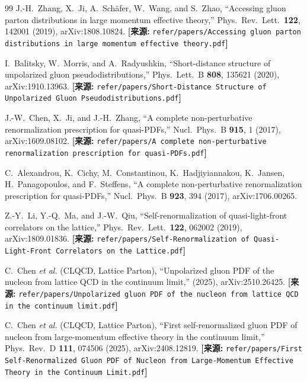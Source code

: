 \documentclass[12pt,a4paper]{ctexart}
\theoremstyle{definition}
\begin{document}
\begin{thebibliography}{99}
J.-H.~Zhang, X.~Ji, A.~Sch\"afer, W.~Wang, and S.~Zhao,
``Accessing gluon parton distributions in large momentum effective theory,''
Phys.\ Rev.\ Lett.\ \textbf{122}, 142001 (2019), arXiv:1808.10824.
\quad\textbf{[来源:} \texttt{refer/papers/Accessing gluon parton distributions in large momentum effective theory.pdf}\textbf{]}

I.~Balitsky, W.~Morris, and A.~Radyushkin,
``Short-distance structure of unpolarized gluon pseudodistributions,''
Phys.\ Lett.\ B \textbf{808}, 135621 (2020), arXiv:1910.13963.
\quad\textbf{[来源:} \texttt{refer/papers/Short-Distance Structure of Unpolarized Gluon Pseudodistributions.pdf}\textbf{]}

J.-W.~Chen, X.~Ji, and J.-H.~Zhang,
``A complete non-perturbative renormalization prescription for quasi-PDFs,''
Nucl.\ Phys.\ B \textbf{915}, 1 (2017), arXiv:1609.08102.
\quad\textbf{[来源:} \texttt{refer/papers/A complete non-perturbative renormalization prescription for quasi-PDFs.pdf}\textbf{]}

C.~Alexandrou, K.~Cichy, M.~Constantinou, K.~Hadjiyiannakou, K.~Jansen, H.~Panagopoulos, and F.~Steffens,
``A complete non-perturbative renormalization prescription for quasi-PDFs,''
Nucl.\ Phys.\ B \textbf{923}, 394 (2017), arXiv:1706.00265.

Z.-Y.~Li, Y.-Q.~Ma, and J.-W.~Qiu,
``Self-renormalization of quasi-light-front correlators on the lattice,''
Phys.\ Rev.\ Lett.\ \textbf{122}, 062002 (2019), arXiv:1809.01836.
\quad\textbf{[来源:} \texttt{refer/papers/Self-Renormalization of Quasi-Light-Front Correlators on the Lattice.pdf}\textbf{]}


C.~Chen \textit{et al.} (CLQCD, Lattice Parton),
``Unpolarized gluon PDF of the nucleon from lattice QCD in the continuum limit,''
(2025), arXiv:2510.26425.
\quad\textbf{[来源:} \texttt{refer/papers/Unpolarized gluon PDF of the nucleon from lattice QCD in the continuum limit.pdf}\textbf{]}

C.~Chen \textit{et al.} (CLQCD, Lattice Parton),
``First self-renormalized gluon PDF of nucleon from large-momentum effective theory in the continuum limit,''
Phys.\ Rev.\ D \textbf{111}, 074506 (2025), arXiv:2408.12819.
\quad\textbf{[来源:} \texttt{refer/papers/First Self-Renormalized Gluon PDF of Nucleon from Large-Momentum Effective Theory in the Continuum Limit.pdf}\textbf{]}


\end{thebibliography}
\end{document}
